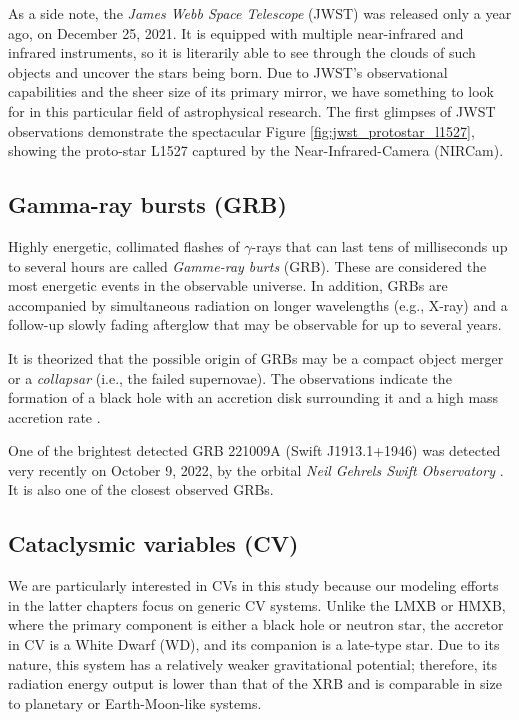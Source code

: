     As a side note, the \emph{James Webb Space Telescope} (JWST) was released only a year ago, on December 25, 2021. It is equipped with multiple near-infrared and infrared instruments, so it is literarily able to see through the clouds of such objects and uncover the stars being born. Due to JWST's observational capabilities and the sheer size of its primary mirror, we have something to look for in this particular field of astrophysical research. The first glimpses of JWST observations demonstrate the spectacular Figure \ref{fig:jwst_protostar_l1527}, showing the proto-star L1527 captured by the Near-Infrared-Camera (NIRCam). 

\subsection{Gamma-ray bursts (GRB)}
    Highly energetic, collimated flashes of $\gamma$-rays that can last tens of milliseconds up to several hours are called \emph{Gamme-ray burts} (GRB). These are considered the most energetic events in the observable universe. In addition, GRBs are accompanied by simultaneous radiation on longer wavelengths (e.g., X-ray) and a follow-up slowly fading afterglow that may be observable for up to several years. 

    It is theorized that the possible origin of GRBs may be a compact object merger or a \emph{collapsar} (i.e., the failed supernovae). The observations indicate the formation of a black hole with an accretion disk surrounding it and a high mass accretion rate \cite{piran2005}.

    One of the brightest detected GRB 221009A (Swift J1913.1+1946) was detected very recently on October 9, 2022, by the orbital \emph{Neil Gehrels Swift Observatory} \cite{grb_221009a}. It is also one of the closest observed GRBs. 


\subsection{Cataclysmic variables (CV)}
    We are particularly interested in CVs in this study because our modeling efforts in the latter chapters focus on generic CV systems. Unlike the LMXB or HMXB, where the primary component is either a black hole or neutron star, the accretor in CV is a White Dwarf (WD), and its companion is a late-type star. Due to its nature, this system has a relatively weaker gravitational potential; therefore, its radiation energy output is lower than that of the XRB and is comparable in size to planetary or Earth-Moon-like systems. 

